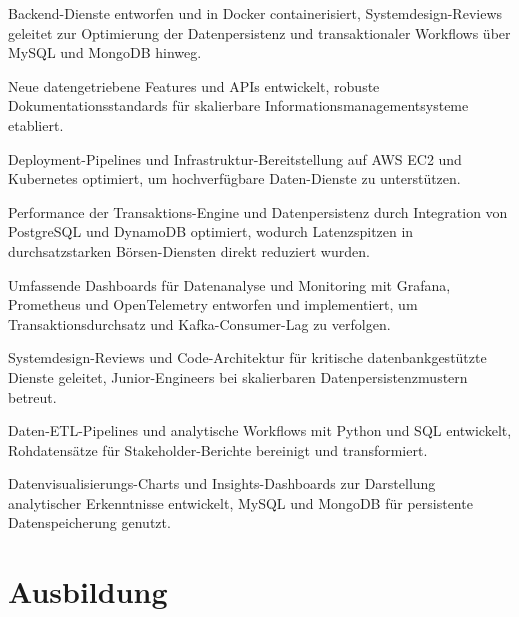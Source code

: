 \documentclass[10pt,a4paper]{resume}
\begin{document}
\bullets
  \item Backend-Dienste entworfen und in Docker containerisiert, Systemdesign-Reviews geleitet zur Optimierung der Datenpersistenz und transaktionaler Workflows über MySQL und MongoDB hinweg.
  \item Neue datengetriebene Features und APIs entwickelt, robuste Dokumentationsstandards für skalierbare Informationsmanagementsysteme etabliert.
  \item Deployment-Pipelines und Infrastruktur-Bereitstellung auf AWS EC2 und Kubernetes optimiert, um hochverfügbare Daten-Dienste zu unterstützen.
\bulletsend
\vspace{1.5pt}
\bullets
  \item Performance der Transaktions-Engine und Datenpersistenz durch Integration von PostgreSQL und DynamoDB optimiert, wodurch Latenzspitzen in durchsatzstarken Börsen-Diensten direkt reduziert wurden.
  \item Umfassende Dashboards für Datenanalyse und Monitoring mit Grafana, Prometheus und OpenTelemetry entworfen und implementiert, um Transaktionsdurchsatz und Kafka-Consumer-Lag zu verfolgen.
  \item Systemdesign-Reviews und Code-Architektur für kritische datenbankgestützte Dienste geleitet, Junior-Engineers bei skalierbaren Datenpersistenzmustern betreut.
\bulletsend
\vspace{1.5pt}
\bullets
  \item Daten-ETL-Pipelines und analytische Workflows mit Python und SQL entwickelt, Rohdatensätze für Stakeholder-Berichte bereinigt und transformiert.
  \item Datenvisualisierungs-Charts und Insights-Dashboards zur Darstellung analytischer Erkenntnisse entwickelt, MySQL und MongoDB für persistente Datenspeicherung genutzt.
\bulletsend
\vspace{1.5pt}

\section{Ausbildung}

\vspace{2pt}
\end{document}
